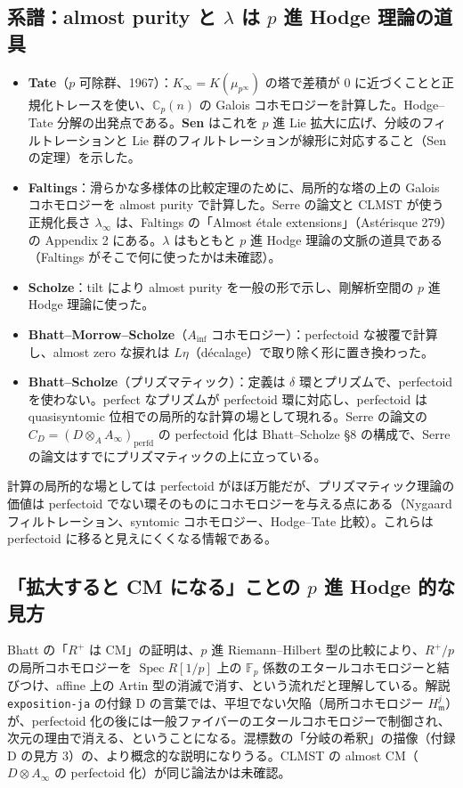 \documentclass[11pt,a4paper]{ltjsarticle}
\theoremstyle{plain}
\theoremstyle{definition}
\theoremstyle{remark}
\theoremstyle{plain}
\newcommand{\m}{\mathfrak{m}}
\begin{document}
\subsection{系譜：almost purity と $\lambda$ は $p$ 進 Hodge 理論の道具}
\begin{itemize}
  \item \textbf{Tate}（$p$ 可除群、1967）：$K_\infty = K(\mu_{p^\infty})$ の塔で差積が $0$ に近づくことと正規化トレースを使い、$\mathbb{C}_p(n)$ の Galois コホモロジーを計算した。Hodge--Tate 分解の出発点である。\textbf{Sen} はこれを $p$ 進 Lie 拡大に広げ、分岐のフィルトレーションと Lie 群のフィルトレーションが線形に対応すること（Sen の定理）を示した。
  \item \textbf{Faltings}：滑らかな多様体の比較定理のために、局所的な塔の上の Galois コホモロジーを almost purity で計算した。Serre の論文と CLMST が使う正規化長さ $\lambda_\infty$ は、Faltings の「Almost étale extensions」（Astérisque 279）の Appendix 2 にある。$\lambda$ はもともと $p$ 進 Hodge 理論の文脈の道具である（Faltings がそこで何に使ったかは未確認）。
  \item \textbf{Scholze}：tilt により almost purity を一般の形で示し、剛解析空間の $p$ 進 Hodge 理論に使った。
  \item \textbf{Bhatt--Morrow--Scholze}（$A_{\mathrm{inf}}$ コホモロジー）：perfectoid な被覆で計算し、almost zero な捩れは $L\eta$（décalage）で取り除く形に置き換わった。
  \item \textbf{Bhatt--Scholze}（プリズマティック）：定義は $\delta$ 環とプリズムで、perfectoid を使わない。perfect なプリズムが perfectoid 環に対応し、perfectoid は quasisyntomic 位相での局所的な計算の場として現れる。Serre の論文の $C_D = (D\otimes_A A_\infty)_{\mathrm{perfd}}$ の perfectoid 化は Bhatt--Scholze §8 の構成で、Serre の論文はすでにプリズマティックの上に立っている。
\end{itemize}
計算の局所的な場としては perfectoid がほぼ万能だが、プリズマティック理論の価値は perfectoid でない環そのものにコホモロジーを与える点にある（Nygaard フィルトレーション、syntomic コホモロジー、Hodge--Tate 比較）。これらは perfectoid に移ると見えにくくなる情報である。

\subsection{「拡大すると CM になる」ことの $p$ 進 Hodge 的な見方}
Bhatt の「$R^+$ は CM」の証明は、$p$ 進 Riemann--Hilbert 型の比較により、$R^+/p$ の局所コホモロジーを $\operatorname{Spec}R[1/p]$ 上の $\mathbb{F}_p$ 係数のエタールコホモロジーと結びつけ、affine 上の Artin 型の消滅で消す、という流れだと理解している。解説 \texttt{exposition-ja} の付録 D の言葉では、平坦でない欠陥（局所コホモロジー $H^j_\m$）が、perfectoid 化の後には一般ファイバーのエタールコホモロジーで制御され、次元の理由で消える、ということになる。混標数の「分岐の希釈」の描像（付録 D の見方 3）の、より概念的な説明になりうる。CLMST の almost CM（$D\otimes A_\infty$ の perfectoid 化）が同じ論法かは未確認。
\end{document}
